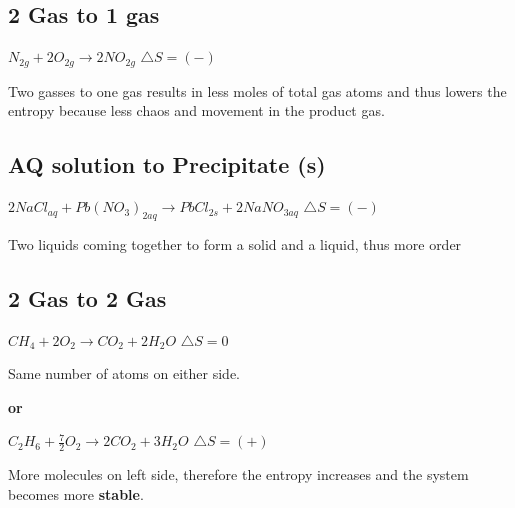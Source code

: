 \documentclass[12pt]{article} %
\begin{document}
\subsection{2 Gas to 1 gas}

$N_{2g} + 2O_{2g} \rightarrow 2NO_{2g}$
$\triangle{S} = (-)$

Two gasses to one gas results in less moles of total gas atoms and thus lowers the entropy because less chaos and movement in the product gas.

\subsection{AQ solution to Precipitate (s)}

$2NaCl_{aq} + Pb(NO_3)_{2aq} \rightarrow PbCl_{2s} + 2NaNO_{3aq}$
$\triangle{S} = (-)$

Two liquids coming together to form a solid and a liquid, thus more order

\subsection{2 Gas to 2 Gas}

$CH_4 + 2O_2 \rightarrow CO_2 + 2H_2O$
$\triangle{S} = 0$

Same number of atoms on either side.

\textbf{or}

$C_2H_6 + \frac{7}{2}O_2 \rightarrow 2CO_2 + 3H_2O$
$\triangle{S} = (+)$

More molecules on left side, therefore the entropy increases and the system becomes more \textbf{stable}.
\end{document}
